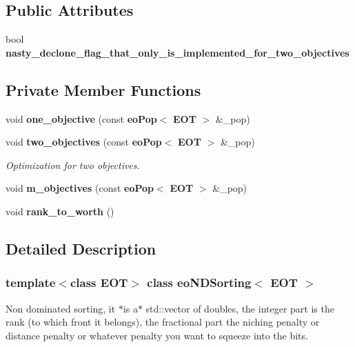 \subsection*{Public Attributes}
\begin{CompactItemize}
\item 
bool {\bf nasty\_\-declone\_\-flag\_\-that\_\-only\_\-is\_\-implemented\_\-for\_\-two\_\-objectives}\label{classeo_n_d_sorting_o0}

\end{CompactItemize}
\subsection*{Private Member Functions}
\begin{CompactItemize}
\item 
void {\bf one\_\-objective} (const {\bf eo\-Pop}$<$ {\bf EOT} $>$ \&\_\-pop)\label{classeo_n_d_sorting_d0}

\item 
void {\bf two\_\-objectives} (const {\bf eo\-Pop}$<$ {\bf EOT} $>$ \&\_\-pop)
\begin{CompactList}\small\item\em Optimization for two objectives. \item\end{CompactList}\item 
void {\bf m\_\-objectives} (const {\bf eo\-Pop}$<$ {\bf EOT} $>$ \&\_\-pop)\label{classeo_n_d_sorting_d2}

\item 
void {\bf rank\_\-to\_\-worth} ()\label{classeo_n_d_sorting_d3}

\end{CompactItemize}


\subsection{Detailed Description}
\subsubsection*{template$<$class EOT$>$ class eo\-NDSorting$<$ EOT $>$}

Non dominated sorting, it $\ast$is a$\ast$ std::vector of doubles, the integer part is the rank (to which front it belongs), the fractional part the niching penalty or distance penalty or whatever penalty you want to squeeze into the bits. 



